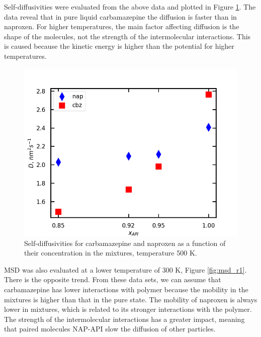 \newpage
Self-diffusivities were evaluated from the above data and plotted in Figure \ref{fig:d}. The data reveal that in pure liquid carbamazepine the diffusion is faster than in naproxen. For higher temperatures, the main factor affecting diffusion is the shape of the molecules, not the strength of the intermolecular interactions. This is caused because the kinetic energy is higher than the potential for higher temperatures.
\begin{figure}[htb!]
	\centering
	\includegraphics[width=0.4\linewidth]{img/d_coeficienty.png} 
	\caption{Self-diffusivities for carbamazepine and naproxen as a function of their concentration in the mixtures, temperature 500 K.}
	\label{fig:d}    
\end{figure}  

MSD was also evaluated at a lower temperature of 300 K, Figure \ref{fig:msd_r1}. There is the opposite trend. From these data sets, we can assume that carbamazepine has lower interactions with polymer because the mobility in the mixtures is higher than that in the pure state. The mobility of naproxen is always lower in mixtures, which is related to its stronger interactions with the polymer. The strength of the intermolecular interactions has a greater impact, meaning that paired molecules NAP-API slow the diffusion of other particles.

